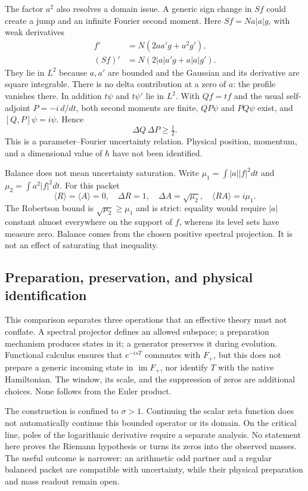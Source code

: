 The factor $a^2$ also resolves a domain issue. A generic sign change
in $Sf$ could create a jump and an infinite Fourier second moment.
Here $Sf=Na|a|g$, with weak derivatives
\begin{align}
 f'&=N(2aa'g+a^2g'),\\
 (Sf)'&=N(2|a|a'g+a|a|g').
\end{align}
They lie in $L^2$ because $a,a'$ are bounded and the Gaussian and its
derivative are square integrable. There is no delta contribution at a
zero of $a$: the profile vanishes there. In addition $t\psi$ and
$t\psi'$ lie in $L^2$. With $Qf=tf$ and the usual self-adjoint
$P=-i\,d/dt$, both second moments are finite, $QP\psi$ and
$PQ\psi$ exist, and $[Q,P]\psi=i\psi$. Hence
\begin{equation}
 \Delta Q\,\Delta P\geq\tfrac12.
\end{equation}
This is a parameter--Fourier uncertainty relation. Physical position,
momentum, and a dimensional value of $\hbar$ have not been identified.

Balance does not mean uncertainty saturation. Write
$\mu_1=\int |a||f|^2dt$ and $\mu_2=\int a^2|f|^2dt$. For this packet
\begin{equation}
 \langle R\rangle=\langle A\rangle=0,\quad
 \Delta R=1,\quad \Delta A=\sqrt{\mu_2},\quad
 \langle RA\rangle=i\mu_1.
\end{equation}
The Robertson bound is $\sqrt{\mu_2}\geq\mu_1$ and is strict:
equality would require $|a|$ constant almost everywhere on the
support of $f$, whereas its level sets have measure zero. Balance
comes from the chosen positive spectral projection. It is not an
effect of saturating that inequality.

\subsection{Preparation, preservation, and physical identification}

This comparison separates three operations that an effective theory
must not conflate. A spectral projector defines an allowed subspace;
a preparation mechanism produces states in it; a generator preserves
it during evolution. Functional calculus ensures that $e^{-isT}$
commutes with $F_+$, but this does not prepare a generic incoming
state in $\operatorname{im}F_+$, nor identify $T$ with the native
Hamiltonian. The window, its scale, and the suppression of zeros
are additional choices. None follows from the Euler product.

The construction is confined to $\sigma>1$. Continuing the scalar
zeta function does not automatically continue this bounded operator
or its domain. On the critical line, poles of the logarithmic
derivative require a separate analysis. No statement here proves
the Riemann hypothesis or turns its zeros into the observed masses.
The useful outcome is narrower: an arithmetic odd partner and a
regular balanced packet are compatible with uncertainty, while
their physical preparation and mass readout remain open.

